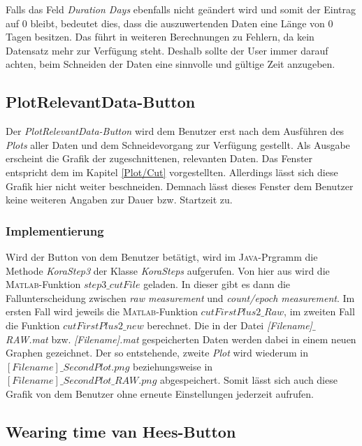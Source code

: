 \documentclass[onecolumn,german]{article}
\begin{document}
Falls das Feld \textit{Duration Days} ebenfalls nicht geändert wird und somit der Eintrag auf 0 bleibt, bedeutet dies, dass die auszuwertenden Daten eine Länge von 0 Tagen besitzen. Das führt in weiteren Berechnungen zu Fehlern, da kein Datensatz mehr zur Verfügung steht. Deshalb sollte der User immer darauf achten, beim Schneiden der Daten eine sinnvolle und gültige Zeit anzugeben.

\subsection{PlotRelevantData-Button}\label{PlotRelevantData-Button}
Der \textit{PlotRelevantData-Button} wird dem Benutzer erst nach dem Ausführen des \textit{Plots} aller Daten und dem Schneidevorgang zur Verfügung gestellt. Als Ausgabe erscheint die Grafik der zugeschnittenen, relevanten Daten. Das Fenster entspricht dem im Kapitel \ref{Plot/Cut} vorgestellten. Allerdings lässt sich diese Grafik hier nicht weiter beschneiden. Demnach lässt dieses Fenster dem Benutzer keine weiteren Angaben zur Dauer bzw. Startzeit zu.

\subsubsection{Implementierung}

Wird der Button von dem Benutzer betätigt, wird im \textsc{Java}-Prgramm die Methode \textit{KoraStep3} der Klasse \textit{KoraSteps} aufgerufen. Von hier aus wird die \textsc{Matlab}-Funktion \textit{$step3\_cutFile$} geladen. In dieser gibt es dann die Fallunterscheidung zwischen \textit{raw measurement} und \textit{count/epoch measurement}. Im ersten Fall wird jeweils die \textsc{Matlab}-Funktion \textit{$cutFirstPlus2\_Raw$}, im zweiten Fall die Funktion \textit{$cutFirstPlus2\_new$} berechnet. Die in der Datei \textit{[Filename]$\_$RAW.mat} bzw. \textit{[Filename].mat} gespeicherten Daten werden dabei in einem neuen Graphen gezeichnet. Der so entstehende, zweite \textit{Plot} wird wiederum in \textit{$[Filename]\_SecondPlot.png$} beziehungsweise in \textit{$[Filename]\_SecondPlot\_RAW.png$} abgespeichert. Somit lässt sich auch diese Grafik von dem Benutzer ohne erneute Einstellungen jederzeit aufrufen.

\subsection{Wearing time van Hees-Button}\label{Wearing time van Hees-Button}
\end{document}
